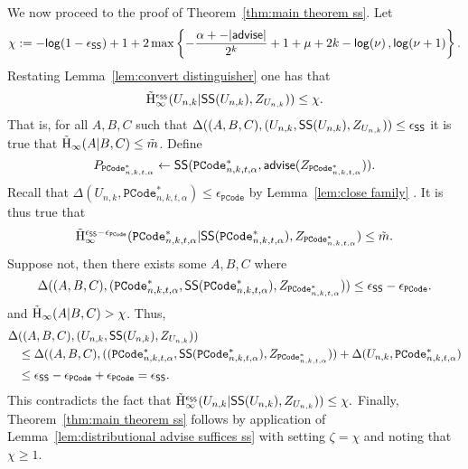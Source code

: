 \noindent
We now proceed to the proof of Theorem~\ref{thm:main theorem ss}.   Let \[\chi:= -\mathsf{log}\!\left(1-\epsilon_{\mathsf{SS}}\right) +1 + 2\max\left\{-\frac{\alpha+-|{\mathsf{advise}}|}{2^k}+1+\mu+2k-\mathsf{log}\!\left(\nu\right), \mathsf{log}\!\left(\nu+1\right)\right\}.\]  Restating Lemma~\ref{lem:convert distinguisher} one has that 
\[
\tilde{\mathrm{H}}_\infty^{\epsilon_{\mathsf{SS}}}(U_{n,k} | {\mathsf{SS}}(U_{n,k}), Z_{U_{n,k}})) \le \chi.
\]
That is, for all $A, B, C$ such that $\Delta((A, B, C), (U_{n,k},{\mathsf{SS}}(U_{n,k}), Z_{U_{n,k}}))\le \epsilon_{{\mathsf{SS}}}$ it is true that $\tilde{\mathrm{H}}_\infty(A|B, C) \le \tilde{m}$.  Define \[P_{\mathtt{PCode}_{n, k, t, \alpha}^{*}}\leftarrow {\ensuremath{\mathsf{SS}}}(\mathtt{PCode}_{n, k, t, \alpha}^{*}, {\mathsf{advise}}(Z_{\mathtt{PCode}_{n, k, t, \alpha}^{*}})).\]
Recall that $\Delta(U_{n,k}, \mathtt{PCode}_{n, k, t, \alpha}^{*}) \le \epsilon_{\mathtt{PCode}}$ by Lemma~\ref{lem:close family} .  
It is thus true that 
\[
\tilde{\mathrm{H}}_\infty^{\epsilon_{{\mathsf{SS}}}-\epsilon_{\mathtt{PCode}}}(\mathtt{PCode}_{n, k, t, \alpha}^{*} | {\mathsf{SS}}(\mathtt{PCode}_{n, k, t, \alpha}^{*}), Z_{\mathtt{PCode}_{n, k, t, \alpha}^{*}})\le \tilde{m}.
\]
Suppose not, then there exists some $A, B, C$ where 
\[
\Delta((A, B, C), (\mathtt{PCode}_{n, k, t, \alpha}^{*} , {\mathsf{SS}}(\mathtt{PCode}_{n, k, t, \alpha}^{*}), Z_{\mathtt{PCode}_{n, k, t, \alpha}^{*}}))\le \epsilon_{{\mathsf{SS}}}-\epsilon_{\mathtt{PCode}}.
\]
and $\tilde{\mathrm{H}}_\infty(A|B, C)>\chi$.
Thus, 
\begin{align*}
\Delta&((A, B, C), (U_{n,k},{\mathsf{SS}}(U_{n,k}), Z_{U_{n,k}}))\\&\le \Delta((A, B, C), ((\mathtt{PCode}_{n, k, t, \alpha}^{*} , {\mathsf{SS}}(\mathtt{PCode}_{n, k, t, \alpha}^{*}), Z_{\mathtt{PCode}_{n, k, t, \alpha}^{*}}))+\Delta(U_{n,k}, \mathtt{PCode}_{n, k, t, \alpha}^{*})\\
&\le \epsilon_{{\mathsf{SS}}}-\epsilon_{\mathtt{PCode}}+ \epsilon_{\mathtt{PCode}} = \epsilon_{{\mathsf{SS}}}.
\end{align*}
This contradicts the fact that $\tilde{\mathrm{H}}_\infty^{\epsilon_{\mathsf{SS}}}(U_{n,k} | {\mathsf{SS}}(U_{n,k}), Z_{U_{n,k}})) \le \chi.$
Finally, Theorem~\ref{thm:main theorem ss} follows by application of Lemma~\ref{lem:distributional advise suffices ss} with setting $\zeta = \chi$ and noting that $\chi\ge 1$.





